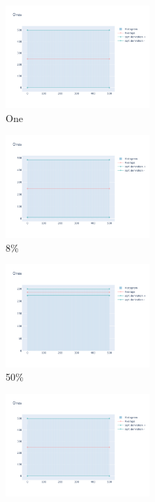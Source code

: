 \documentclass[12pt, fleqn]{report}                             %
\theoremstyle{break}                                            %
\begin{document}
      \begin{figure}[ht!]
        \centering
        \begin{subfigure}[b]{0.4\linewidth}
          \includegraphics[width=0.6\textwidth]{Images/7/dia-a.png}
          \caption{One}
        \end{subfigure}
        \begin{subfigure}[b]{0.4\linewidth}
          \includegraphics[width=0.6\textwidth]{Images/7/dia-b.png}
          \caption{8\%}
        \end{subfigure}
        \begin{subfigure}[b]{0.4\linewidth}
          \includegraphics[width=0.6\textwidth]{Images/7/dia-c.png}
          \caption{50\%}
        \end{subfigure}
        \begin{subfigure}[b]{0.4\linewidth}
          \includegraphics[width=0.6\textwidth]{Images/7/dia-d.png}

\end{subfigure}
\end{figure}
\end{document}
